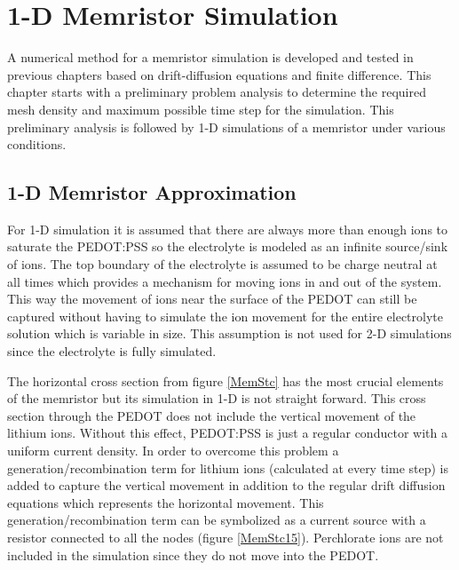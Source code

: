 
\chapter{1-D Memristor Simulation} %

\label{Chapter6} %


\begin{doublespace}

A numerical method for a memristor simulation is developed and tested in previous chapters based on drift-diffusion equations and finite difference. This chapter starts with a preliminary problem analysis to determine the required mesh density and maximum possible time step for the simulation. This preliminary analysis is followed by 1-D simulations of a memristor under various conditions.


\section{1-D Memristor Approximation}

 For 1-D simulation it is assumed that there are always more than enough ions to saturate the PEDOT:PSS so the electrolyte is modeled as an infinite source/sink of ions. The top boundary of the electrolyte is assumed to be charge neutral at all times which provides a mechanism for moving ions in and out of the system. This way the movement of ions near the surface of the PEDOT can still be captured without having to simulate the ion movement for the entire electrolyte solution which is variable in size. This assumption is not used for 2-D simulations since the electrolyte is fully simulated.
 
The horizontal cross section from figure \ref{MemStc} has the most crucial elements of the memristor but its simulation in 1-D is not straight forward. This cross section through the PEDOT does not include the vertical movement of the lithium ions. Without this effect, PEDOT:PSS is just a regular conductor with a uniform current density. In order to overcome this problem a generation/recombination term for lithium ions (calculated at every time step) is added to capture the vertical movement in addition to the regular drift diffusion equations which represents the horizontal movement. This generation/recombination term can be symbolized as a current source with a resistor connected to all the nodes (figure \ref{MemStc15}). Perchlorate ions are not included in the simulation since they do not move into the PEDOT.


\end{doublespace}
